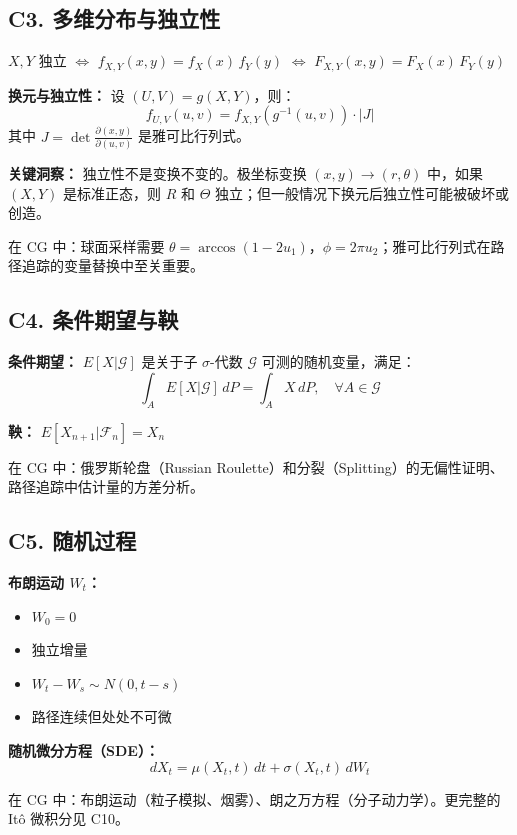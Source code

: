 \subsection{C3. 多维分布与独立性}

$X, Y$ 独立 $\iff$ $f_{X,Y}(x,y) = f_X(x)\,f_Y(y)$ $\iff$ $F_{X,Y}(x,y) = F_X(x)\,F_Y(y)$

\textbf{换元与独立性：} 设 $(U,V) = g(X,Y)$，则：
\[
f_{U,V}(u,v) = f_{X,Y}(g^{-1}(u,v)) \cdot |J|
\]
其中 $J = \det\frac{\partial(x,y)}{\partial(u,v)}$ 是雅可比行列式。

\textbf{关键洞察：} 独立性不是变换不变的。极坐标变换 $(x,y) \to (r,\theta)$ 中，如果 $(X,Y)$ 是标准正态，则 $R$ 和 $\Theta$ 独立；但一般情况下换元后独立性可能被破坏或创造。

在 CG 中：球面采样需要 $\theta = \arccos(1-2u_1)$，$\phi = 2\pi u_2$；雅可比行列式在路径追踪的变量替换中至关重要。

\subsection{C4. 条件期望与鞅}

\textbf{条件期望：} $E[X|\mathcal{G}]$ 是关于子 $\sigma$-代数 $\mathcal{G}$ 可测的随机变量，满足：
\[
\int_A E[X|\mathcal{G}]\,dP = \int_A X\,dP, \quad \forall A \in \mathcal{G}
\]

\textbf{鞅：} $E[X_{n+1}|\mathcal{F}_n] = X_n$

在 CG 中：俄罗斯轮盘（Russian Roulette）和分裂（Splitting）的无偏性证明、路径追踪中估计量的方差分析。

\subsection{C5. 随机过程}

\textbf{布朗运动 $W_t$：}
\begin{itemize}
  \item $W_0 = 0$
  \item 独立增量
  \item $W_t - W_s \sim N(0, t-s)$
  \item 路径连续但处处不可微
\end{itemize}

\textbf{随机微分方程（SDE）：}
\[
dX_t = \mu(X_t, t)\,dt + \sigma(X_t, t)\,dW_t
\]

在 CG 中：布朗运动（粒子模拟、烟雾）、朗之万方程（分子动力学）。更完整的 Itô 微积分见 C10。

